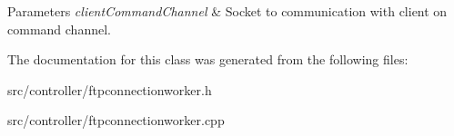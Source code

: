 \begin{DoxyParams}{Parameters}
{\em client\+Command\+Channel} & Socket to communication with client on command channel. \\
\hline
\end{DoxyParams}


The documentation for this class was generated from the following files\+:\begin{DoxyCompactItemize}
\item 
src/controller/ftpconnectionworker.\+h\item 
src/controller/ftpconnectionworker.\+cpp\end{DoxyCompactItemize}
